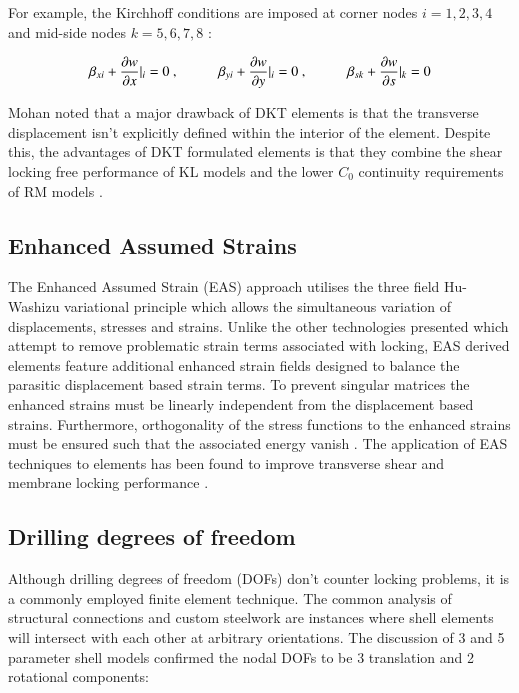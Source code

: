 For example, the Kirchhoff conditions are imposed at corner nodes $i = 1, 2, 3, 4$ and mid-side nodes $k = 5, 6, 7, 8$ \cite{Bar12}:

\begin{equation} 
\beta_{xi} + \frac{\partial w}{\partial x} \rvert_i = 0\ ,
\hspace{10mm}
\beta_{yi} + \frac{\partial w}{\partial y} \rvert_i = 0\ ,
\hspace{10mm}
\beta_{sk} + \frac{\partial w}{\partial s} \rvert_k = 0
\label{eqsdkt}
\end{equation}

Mohan \cite{Mohan97} noted that a major drawback of DKT elements is that the transverse displacement isn't explicitly defined within the interior of the element. Despite this, the advantages of DKT formulated elements is that they combine the shear locking free performance of KL models and the lower $C_0$ continuity requirements of RM models \cite{Bletz16}.

\subsection{Enhanced Assumed Strains}

The Enhanced Assumed Strain (EAS) approach \cite{Simo1990} utilises the three field Hu-Washizu variational principle which allows the simultaneous variation of displacements, stresses and strains. Unlike the other technologies presented which attempt to remove problematic strain terms associated with locking, EAS derived elements feature additional enhanced strain fields designed to balance the parasitic displacement based strain terms. To prevent singular matrices the enhanced strains must be linearly independent from the displacement based strains. Furthermore, orthogonality of the stress functions to the enhanced strains must be ensured such that the associated energy vanish \cite{Echter13}. The application of EAS techniques to elements has been found to improve transverse shear and membrane locking performance \cite{Simo1990} \cite{BischLitBook04} \cite{Echter13}.

\subsection{Drilling degrees of freedom}

Although drilling degrees of freedom (DOFs) don't counter locking problems, it is a commonly employed finite element technique. The common analysis of structural connections and custom steelwork are instances where shell elements will intersect with each other at arbitrary orientations. The discussion of 3 and 5 parameter shell models confirmed the nodal DOFs to be 3 translation and 2 rotational components:

